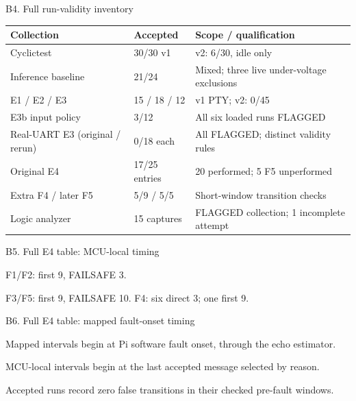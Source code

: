 \begin{frame}[t]{B4. Full run-validity inventory}
\begin{tabular}{@{}L{.40\linewidth}L{.15\linewidth}L{.36\linewidth}@{}}\toprule
Collection & Accepted & Scope / qualification\\\midrule
Cyclictest & 30/30 v1 & v2: 6/30, idle only\\[3pt]
Inference baseline & 21/24 & Mixed; three live under-voltage exclusions\\[3pt]
E1 / E2 / E3 & 15 / 18 / 12 & v1 PTY; v2: 0/45\\[3pt]
E3b input policy & 3/12 & All six loaded runs FLAGGED\\[3pt]
Real-UART E3 (original / rerun) & 0/18 each & All FLAGGED; distinct validity rules\\[3pt]
Original E4 & 17/25 entries & 20 performed; 5 F5 unperformed\\[3pt]
Extra F4 / later F5 & 5/9 / 5/5 & Short-window transition checks\\[3pt]
Logic analyzer & 15 captures & FLAGGED collection; 1 incomplete attempt\\\bottomrule
\end{tabular}\par
{}
\end{frame}

\begin{frame}[t]{B5. Full E4 table: MCU-local timing}
\centering\par\bigskip\raggedright
F1/F2: first 9, FAILSAFE 3.\par\medskip F3/F5: first 9, FAILSAFE 10. F4: six direct 3; one first 9.
\end{frame}

\begin{frame}[t]{B6. Full E4 table: mapped fault-onset timing}
\centering\par\bigskip\raggedright
Mapped intervals begin at Pi software fault onset, through the echo estimator.\par\medskip
MCU-local intervals begin at the last accepted message selected by reason.\par\medskip
Accepted runs record zero false transitions in their checked pre-fault windows.
\end{frame}

